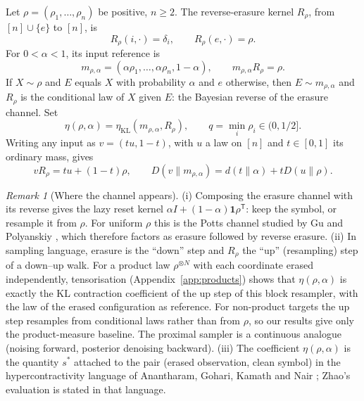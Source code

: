 \documentclass[11pt,a4paper]{article}
\numberwithin{equation}{section}
\theoremstyle{definition}
\theoremstyle{remark}
\newtheorem{remark}[theorem]{Remark}
\newcommand{\KL}{D}
\newcommand{\etaKL}{\eta_{\mathrm{KL}}}
\newcommand{\one}{\mathbf 1}
\newcommand{\mra}{m_{\rho,\alpha}}
\begin{document}
Let \(\rho=(\rho_1,\ldots,\rho_n)\) be positive, \(n\ge2\). The
reverse-erasure kernel \(R_\rho\), from \([n]\cup\{e\}\) to \([n]\), is
\begin{equation}\label{eq:reverse}
R_\rho(i,\cdot)=\delta_i,\qquad R_\rho(e,\cdot)=\rho.
\end{equation}
For \(0<\alpha<1\), its input reference is
\begin{equation}\label{eq:reference}
\mra=(\alpha\rho_1,\ldots,\alpha\rho_n,1-\alpha),
\qquad \mra R_\rho=\rho.
\end{equation}
If \(X\sim\rho\) and \(E\) equals \(X\) with probability \(\alpha\) and \(e\)
otherwise, then \(E\sim\mra\) and \(R_\rho\) is the conditional law of \(X\)
given \(E\): the Bayesian reverse of the erasure channel. Set
\[
\eta(\rho,\alpha)=\etaKL(\mra,R_\rho),\qquad
q=\min_i\rho_i\in(0,1/2].
\]
Writing any input as \(v=(tu,1-t)\), with \(u\) a law on \([n]\) and
\(t\in[0,1]\) its ordinary mass, gives
\begin{equation}\label{eq:decomp}
vR_\rho=tu+(1-t)\rho,\qquad
\KL(v\|\mra)=d(t\|\alpha)+t\KL(u\|\rho).
\end{equation}

\begin{remark}[Where the channel appears]\label{rem:where}
(i) Composing the erasure channel with its reverse gives the lazy reset
kernel \(\alpha I+(1-\alpha)\one\rho^{\mathsf T}\): keep the symbol, or
resample it from \(\rho\). For uniform \(\rho\) this is the Potts channel
studied by Gu and Polyanskiy \cite{gupolyanskiy}, which therefore factors as
erasure followed by reverse erasure.
(ii) In sampling language, erasure is the ``down'' step and \(R_\rho\) the
``up'' (resampling) step of a down--up walk. For a product law
\(\rho^{\otimes N}\) with each coordinate erased independently,
tensorisation (Appendix~\ref{app:products}) shows that
\(\eta(\rho,\alpha)\) is exactly the KL contraction coefficient of the up
step of this block resampler, with the law of the erased configuration as
reference. For non-product targets the up step resamples from conditional
laws rather than from \(\rho\), so our results give only the product-measure
baseline. The proximal sampler \cite{proximal} is a continuous analogue
(noising forward, posterior denoising backward).
(iii) The coefficient \(\eta(\rho,\alpha)\) is the quantity \(s^*\)
attached to the pair (erased observation, clean symbol) in the
hypercontractivity language of Anantharam, Gohari, Kamath and Nair
\cite{anantharam}; Zhao's evaluation \cite[Theorem~3.5.4]{zhao} is stated in
that language.
\end{remark}
\end{document}
